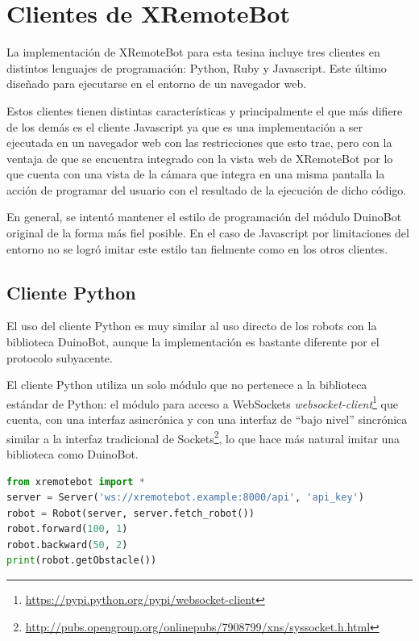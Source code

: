 \chapter{Clientes de XRemoteBot}\label{cha:clientes}

La implementación de XRemoteBot para esta tesina incluye tres clientes en distintos
lenguajes de programación: Python, Ruby y Javascript. Este último diseñado para ejecutarse
en el entorno de un navegador web.

Estos clientes tienen distintas características y principalmente el que más
difiere de los demás es el cliente Javascript ya que es una implementación a
ser ejecutada en un navegador web con las restricciones que esto trae, pero
con la ventaja de que
se encuentra integrado con la vista web de XRemoteBot por lo que cuenta con una
vista de la cámara que integra en una misma pantalla la acción de programar del
usuario con el resultado de la ejecución de dicho código.

En general, se intentó mantener el estilo de programación del módulo DuinoBot
original de la forma más fiel posible. En el caso de Javascript por
limitaciones del entorno
no se logró imitar este estilo tan fielmente como en los otros clientes.

\section{Cliente Python}\label{sec:python}
El uso del cliente Python es muy similar al uso directo de los robots con la
biblioteca DuinoBot, aunque la implementación es bastante diferente por el protocolo
subyacente.

El cliente Python utiliza un solo módulo que no pertenece a la biblioteca estándar
de Python: el módulo para acceso a WebSockets
\textit{websocket-client}\footnote{\url{https://pypi.python.org/pypi/websocket-client}}
que cuenta, con una interfaz asincrónica y con una interfaz de ``bajo nivel''
sincrónica similar a la interfaz tradicional de
Sockets\footnote{\url{http://pubs.opengroup.org/onlinepubs/7908799/xns/syssocket.h.html}},
lo que hace más
natural imitar una biblioteca como DuinoBot.

\begin{lstlisting}[language=Python,
caption={Ejemplo con XRemoteBot para Python},label=lst:ejemplo_xremotebot_python]
from xremotebot import *
server = Server('ws://xremotebot.example:8000/api', 'api_key')
robot = Robot(server, server.fetch_robot())
robot.forward(100, 1)
robot.backward(50, 2)
print(robot.getObstacle())
\end{lstlisting}

